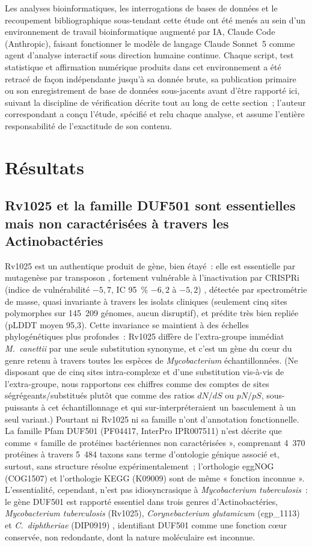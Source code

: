 \documentclass[11pt,a4paper]{article}
\newcommand{\mtb}{\textit{Mycobacterium tuberculosis}}
\begin{document}
Les analyses bioinformatiques, les interrogations de bases de données et le recoupement bibliographique sous-tendant cette étude ont été menés au sein d'un environnement de travail bioinformatique augmenté par IA, Claude Code (Anthropic), faisant fonctionner le modèle de langage Claude Sonnet~5 comme agent d'analyse interactif sous direction humaine continue. Chaque script, test statistique et affirmation numérique produits dans cet environnement a été retracé de façon indépendante jusqu'à sa donnée brute, sa publication primaire ou son enregistrement de base de données sous-jacents avant d'être rapporté ici, suivant la discipline de vérification décrite tout au long de cette section~; l'auteur correspondant a conçu l'étude, spécifié et relu chaque analyse, et assume l'entière responsabilité de l'exactitude de son contenu.

\section{Résultats}

\subsection{Rv1025 et la famille DUF501 sont essentielles mais non caractérisées à travers les Actinobactéries}

Rv1025 est un authentique produit de gène, bien étayé~: elle est essentielle par mutagenèse par transposon \citep{dejesus2017essentiality}, fortement vulnérable à l'inactivation par CRISPRi (indice de vulnérabilité $-5,7$, IC 95~\% $-6,2$ à $-5,2$) \citep{bosch2021vulnerability}, détectée par spectrométrie de masse, quasi invariante à travers les isolats cliniques (seulement cinq sites polymorphes sur 145~209 génomes, aucun disruptif), et prédite très bien repliée (pLDDT moyen 95,3). Cette invariance se maintient à des échelles phylogénétiques plus profondes~: Rv1025 diffère de l'extra-groupe immédiat \textit{M.\ canettii} par une seule substitution synonyme, et c'est un gène du cœur du genre retenu à travers toutes les espèces de \textit{Mycobacterium} échantillonnées. (Ne disposant que de cinq sites intra-complexe et d'une substitution vis-à-vis de l'extra-groupe, nous rapportons ces chiffres comme des comptes de sites ségrégeants/substitués plutôt que comme des ratios $dN/dS$ ou $pN/pS$, sous-puissants à cet échantillonnage et qui sur-interpréteraient un basculement à un seul variant.) Pourtant ni Rv1025 ni sa famille n'ont d'annotation fonctionnelle. La famille Pfam DUF501 (PF04417, InterPro IPR007511) n'est décrite que comme « famille de protéines bactériennes non caractérisées », comprenant 4~370 protéines à travers 5~484 taxons sans terme d'ontologie génique associé et, surtout, sans structure résolue expérimentalement~; l'orthologie eggNOG (COG1507) et l'orthologie KEGG (K09009) sont de même « fonction inconnue ». L'essentialité, cependant, n'est pas idiosyncrasique à \mtb{}~: le gène DUF501 est rapporté essentiel dans trois genres d'Actinobactéries, \mtb{} (Rv1025), \textit{Corynebacterium glutamicum} (cgp\_1113) et \textit{C.\ diphtheriae} (DIP0919) \citep{goodall2023diphtheriae}, identifiant DUF501 comme une fonction cœur conservée, non redondante, dont la nature moléculaire est inconnue.
\end{document}
